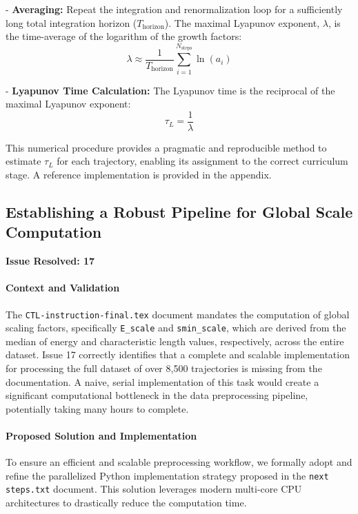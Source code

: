 \documentclass[11pt, a4paper]{article}
\begin{document}
\begin{enumerate}
        
- \textbf{Averaging:} Repeat the integration and renormalization loop for a sufficiently long total integration horizon ($T_{\text{horizon}}$). The maximal Lyapunov exponent, $\lambda$, is the time-average of the logarithm of the growth factors:
        \begin{equation}
            \lambda \approx \frac{1}{T_{\text{horizon}}} \sum_{i=1}^{N_{\text{steps}}} \ln(a_i)
        \end{equation}
        
- \textbf{Lyapunov Time Calculation:} The Lyapunov time is the reciprocal of the maximal Lyapunov exponent:
        \begin{equation}
            \tau_L = \frac{1}{\lambda}
        \end{equation}
    
    This numerical procedure provides a pragmatic and reproducible method to estimate $\tau_L$ for each trajectory, enabling its assignment to the correct curriculum stage. A reference implementation is provided in the appendix.
\end{enumerate}









\subsection{Establishing a Robust Pipeline for Global Scale Computation}
\textbf{Issue Resolved: 17}
\paragraph{Context and Validation}
The \texttt{CTL-instruction-\allowbreak final.tex} document mandates the computation of global scaling factors, specifically \texttt{E\_scale} and \texttt{smin\_scale}, which are derived from the median of energy and characteristic length values, respectively, across the entire dataset. Issue 17 correctly identifies that a complete and scalable implementation for processing the full dataset of over 8,500 trajectories is missing from the documentation. A naive, serial implementation of this task would create a significant computational bottleneck in the data preprocessing pipeline, potentially taking many hours to complete.

\paragraph{Proposed Solution and Implementation}
To ensure an efficient and scalable preprocessing workflow, we formally adopt and refine the parallelized Python implementation strategy proposed in the \texttt{next steps.txt} document. This solution leverages modern multi-core CPU architectures to drastically reduce the computation time.
\end{document}

